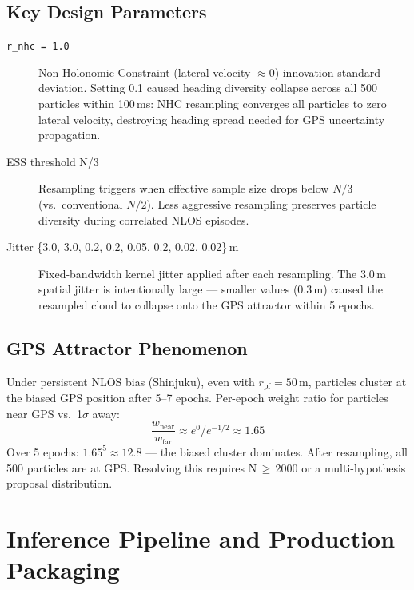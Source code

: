 \documentclass[12pt,a4paper]{article}
\begin{document}
\subsection{Key Design Parameters}

\begin{description}
  \item[\texttt{r\_nhc = 1.0}] Non-Holonomic Constraint (lateral velocity $\approx 0$)
    innovation standard deviation.
    Setting 0.1 caused heading diversity collapse across all 500 particles within 100\,ms:
    NHC resampling converges all particles to zero lateral velocity, destroying heading
    spread needed for GPS uncertainty propagation.

  \item[ESS threshold N/3] Resampling triggers when effective sample size drops below
    $N/3$ (vs.\ conventional $N/2$).
    Less aggressive resampling preserves particle diversity during correlated NLOS
    episodes.

  \item[Jitter \{3.0, 3.0, 0.2, 0.2, 0.05, 0.2, 0.02, 0.02\}\,m] Fixed-bandwidth
    kernel jitter applied after each resampling.
    The 3.0\,m spatial jitter is intentionally large — smaller values (0.3\,m) caused
    the resampled cloud to collapse onto the GPS attractor within 5 epochs.
\end{description}

\subsection{GPS Attractor Phenomenon}

Under persistent NLOS bias (Shinjuku), even with $r_\mathrm{pf} = 50$\,m, particles
cluster at the biased GPS position after 5--7 epochs.
Per-epoch weight ratio for particles near GPS vs.\ 1$\sigma$ away:
\[
  \frac{w_\mathrm{near}}{w_\mathrm{far}} \approx e^{0} / e^{-1/2} \approx 1.65
\]
Over 5 epochs: $1.65^5 \approx 12.8$ — the biased cluster dominates.
After resampling, all 500 particles are at GPS.
Resolving this requires N\,$\geq$\,2000 or a multi-hypothesis proposal distribution.

\section{Inference Pipeline and Production Packaging}
\end{document}
